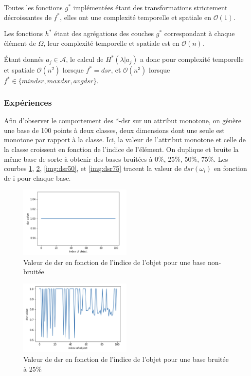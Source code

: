 \documentclass[a4paper]{article}
\begin{document}
Toutes les fonctions $g^*$ implémentées étant des transformations strictement
décroissantes de $f^*$, elles ont une complexité temporelle et spatiale en
$\mathcal{O}(1)$. 

Les fonctions $h^*$ étant des agrégations des couches $g^*$ correspondant à
chaque élément de $\Omega$, leur complexité
temporelle et spatiale est en $\mathcal{O}(n)$.

Étant donnés $a_j \in \mathcal{A}$, le calcul de $H^*(\lambda|a_j)$ a donc pour
complexité temporelle et spatiale $\mathcal{O}(n^2)$ lorsque $f^* = dsr$, et
$\mathcal{O}(n^3)$ lorsque $f^* \in \{mindsr, maxdsr, avgdsr\}$.

\subsubsection{Expériences}

Afin d'observer le comportement des *-dsr sur un attribut monotone, on génère
une base de 100 points à deux classes, deux dimensions dont une seule est
monotone par rapport à la classe.  Ici, la valeur de l'attribut monotone et
celle de la classe croissent en fonction de l'indice de l'élément. On duplique
et bruite la même base de sorte à obtenir des bases bruitées à 0\%, 25\%, 50\%,
75\%.  Les courbes \ref{img:dsr0}, \ref{img:dsr25}, \ref{img:dsr50}, et
\ref{img:dsr75} tracent la valeur de $dsr(\omega_i)$ en fonction de i pour
chaque base. \\

\begin{figure}[H]
	\center 
	\includegraphics[width=0.5\textwidth]{images/dsr_0.png}
    \caption{Valeur de dsr en fonction de l'indice de l'objet pour une base
    non-bruitée}
    \label{img:dsr0}
\end{figure}

\begin{figure}[H]
	\center 
	\includegraphics[width=0.5\textwidth]{images/dsr_25.png}
    \caption{Valeur de dsr en fonction de l'indice de l'objet pour une base
    bruitée à 25\%}
    \label{img:dsr25}
\end{figure}
\end{document}
